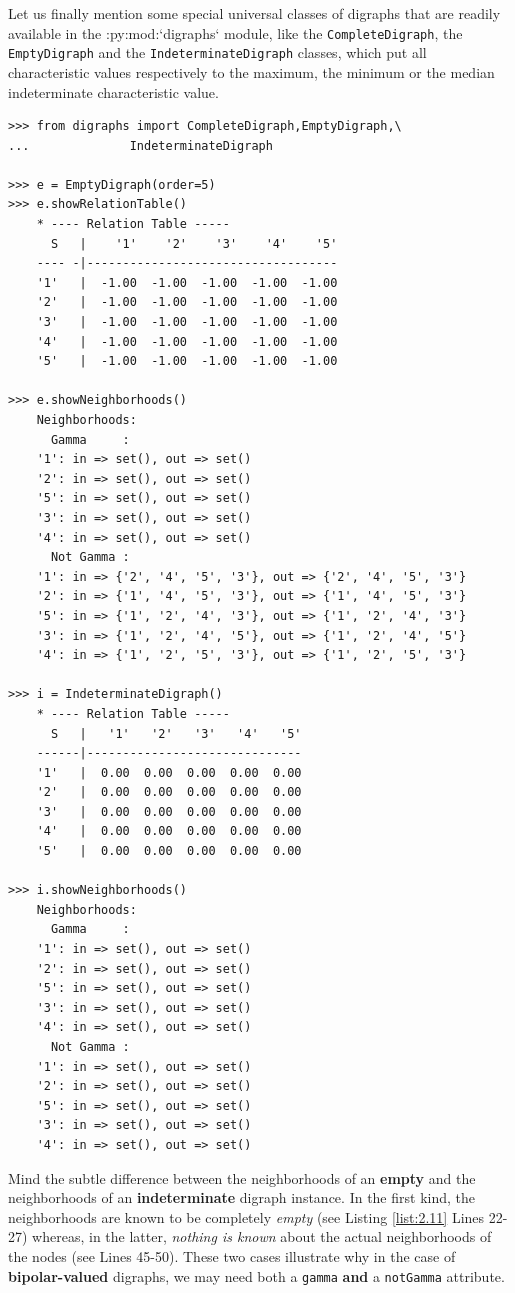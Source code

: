 Let us finally mention some special universal classes of digraphs that are readily available in the :py:mod:`digraphs` module, like the \texttt{CompleteDigraph}, the \texttt{EmptyDigraph} and the \texttt{IndeterminateDigraph} classes, which put all characteristic values respectively to the maximum, the minimum or the median indeterminate characteristic value.
\begin{lstlisting}[caption={Complete, empty and indeterminate digraphs},label=list:2.11]
>>> from digraphs import CompleteDigraph,EmptyDigraph,\
...   			 IndeterminateDigraph
   
>>> e = EmptyDigraph(order=5)
>>> e.showRelationTable()
    * ---- Relation Table -----
      S   |    '1'    '2'    '3'    '4'	   '5'	  
    ---- -|-----------------------------------
    '1'   |  -1.00  -1.00  -1.00  -1.00	 -1.00	 
    '2'   |  -1.00  -1.00  -1.00  -1.00	 -1.00	 
    '3'   |  -1.00  -1.00  -1.00  -1.00	 -1.00	 
    '4'   |  -1.00  -1.00  -1.00  -1.00	 -1.00	 
    '5'   |  -1.00  -1.00  -1.00  -1.00	 -1.00

>>> e.showNeighborhoods() 
    Neighborhoods:
      Gamma     :
    '1': in => set(), out => set()
    '2': in => set(), out => set()
    '5': in => set(), out => set()
    '3': in => set(), out => set()
    '4': in => set(), out => set()
      Not Gamma :
    '1': in => {'2', '4', '5', '3'}, out => {'2', '4', '5', '3'}
    '2': in => {'1', '4', '5', '3'}, out => {'1', '4', '5', '3'}
    '5': in => {'1', '2', '4', '3'}, out => {'1', '2', '4', '3'}
    '3': in => {'1', '2', '4', '5'}, out => {'1', '2', '4', '5'}
    '4': in => {'1', '2', '5', '3'}, out => {'1', '2', '5', '3'}

>>> i = IndeterminateDigraph()
    * ---- Relation Table -----
      S   |   '1'   '2'	  '3'	'4'   '5'	  
    ------|------------------------------
    '1'   |  0.00  0.00	 0.00  0.00  0.00	 
    '2'   |  0.00  0.00	 0.00  0.00  0.00	 
    '3'   |  0.00  0.00	 0.00  0.00  0.00	 
    '4'   |  0.00  0.00	 0.00  0.00  0.00	 
    '5'   |  0.00  0.00	 0.00  0.00  0.00	 

>>> i.showNeighborhoods()
    Neighborhoods:
      Gamma     :
    '1': in => set(), out => set()
    '2': in => set(), out => set()
    '5': in => set(), out => set()
    '3': in => set(), out => set()
    '4': in => set(), out => set()
      Not Gamma :
    '1': in => set(), out => set()
    '2': in => set(), out => set()
    '5': in => set(), out => set()
    '3': in => set(), out => set()
    '4': in => set(), out => set()
\end{lstlisting}

Mind the subtle difference between the neighborhoods of an \textbf{empty} and the neighborhoods of an \textbf{indeterminate} digraph instance. In the first kind, the neighborhoods are known to be completely \emph{empty}  (see Listing \ref{list:2.11} Lines 22-27) whereas, in the latter, \emph{nothing is known} about the actual neighborhoods of the nodes  (see Lines 45-50). These two cases illustrate why in the case of \textbf{bipolar-valued} digraphs, we may need both a \texttt{gamma} \textbf{and} a \texttt{notGamma} attribute.
